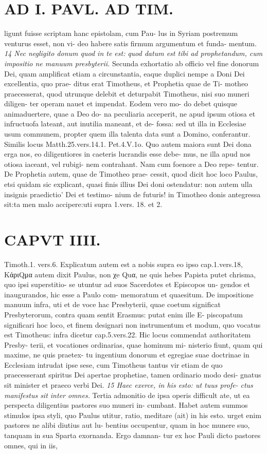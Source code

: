 \documentclass{article}
\begin{document}
\begin{pages}
\section*{AD I. PAVL. AD TIM. }
\marginpar{[ p.234 ]}ligunt fuisse scriptam hanc epistolam, cum Pau- lus in Syriam postremum venturus esset, non vi- deo habere satis firmum argumentum et funda- mentum. \textit{14 Nec negligito donum quod in te est:} \textit{quod datum est tibi ad prophetandum, cum} \textit{impositio ne manuum presbyterii.} Secunda exhortatio ab officio vel fine donorum Dei, quam amplificat etiam a circunstantia, eaque duplici nempe a Doni Dei excellentia, quo prae- ditus erat Timotheus, et Prophetia quae de Ti- motheo praecesserat, quod utrunque delebit et deturpabit Timotheus, nisi suo muneri diligen- ter operam nauet et impendat. Eodem vero mo- do debet quisque animaduertere, quae a Deo do- na peculiaria acceperit, ne apud ipsum otiosa et infructuofa lateant, aut inutilia maneant, et de- fossa: sed ut illa in Ecclesiae usum communem, propter quem illa talenta data sunt a Domino, conferantur. Similis locus Matth.25.vers.14.1. Pet.4.V.1o. Quo autem maiora sunt Dei dona erga nos, eo diligentiores in caeteris lucrandis esse debe- mus, ne illa apud nos otiosa iaceant, vel rubigi- nem contrahant. Nam cum foenore a Deo repe- tentur. De Prophetia autem, quae de Timotheo prae- cessit, quod dicit hoc loco Paulus, etsi quidam sic explicant, quasi finis illius Dei doni ostendatur: non autem ulla insignis praedictio' Dei et testimo- nium de futuris! in Timotheo donis antegressa sit:ta men malo accipere:uti supra 1.vers. 18. et 2. 
\section*{CAPVT  IIII. }
\marginpar{[ p.235 ]}Timoth.1. vers.6. Explicatum autem est a nobis supra eo ipso cap.1.vers.18, ΚάριQμα autem dixit Paulus, non χe Quα, ne quis hebes Papista putet chrisma, quo ipsi superstitio- se utuntur ad suos Sacerdotes et Episcopos un- gendos et inaugurandos, hic esse a Paulo com- memoratum et quaesitum. De impositione manuum infra, uti et de voce hac Presbyterii, quae coetum significat Presbyterorum, contra quam sentit Erasmus: putat enim ille E- piscopatum significari hoc loco, et finem designari non instrumentum et modum, quo vocatus est Timotheus: infra dicetur cap.5.vers.22. Hic locus commendat authoritatem Presby- terii, et vocationes ordinarias, quae hominum mi- nisterio fiunt, quam qui maxime, ne quis praetex- tu ingentium donorum et egregiae suae doctrinae in Ecclesiam intrudat ipse sese, cum Timotheus tantus vir etiam de quo praecesserant spiritus Dei apertae prophetiae, tamen ordinario modo desi- gnatus sit minister et praeco verbi Dei. \textit{15 Haec exerce, in his esto: ut tuus profe-} \textit{ctus manifestus sit inter omnes.} Tertia admonitio de ipsa operis difficult ate, ut ea perspecta diligentius pastores suo muneri in- cumbant. Habet autem summos stimulos ipsa styli, quo Paulus utitur, ratio, meditare (ait) in his esto. urget enim pastores ne alibi diutius aut lu- bentius occupentur, quam in hoc munere suo, tanquam in sua Sparta exornanda. Ergo damnan- tur ex hoc Pauli dicto pastores omnes, qui in iis, 

\end{pages}
\end{document}
